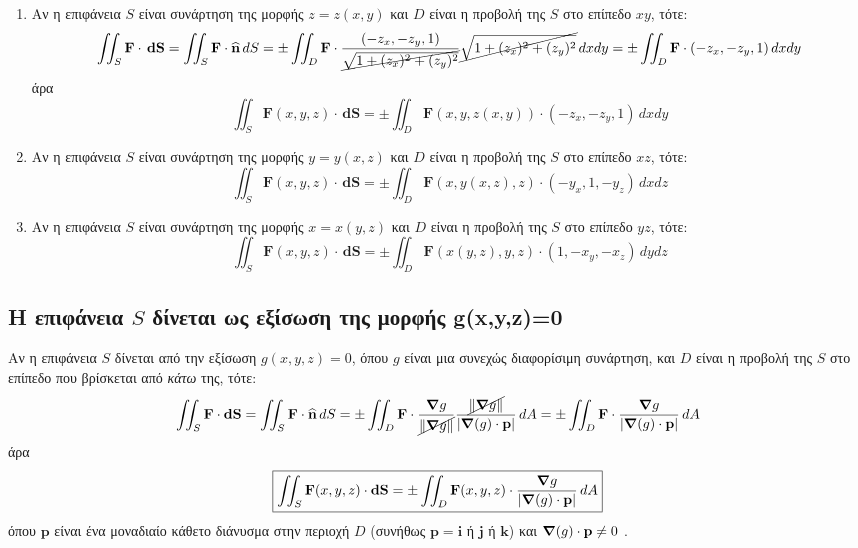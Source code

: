 \begin{enumerate}
  \item Αν η επιφάνεια $S$ είναι συνάρτηση της μορφής $ z=z(x,y) $ και $D$ είναι η 
    προβολή της $S$ στο επίπεδο $ xy $, τότε: 
    \[
      \iint_{S} \mathbf{F} \cdot \,{\mathbf{dS}} = \iint_{S} \mathbf{F} \cdot
      \mathbf{\widehat{n}} \,{dS} = 
      \pm\iint_{D} 
      \mathbf{F} \cdot \frac{(-z_{x},-z_{y},1)}{\cancel{\sqrt{1+(z_{x})^{2}+
      (z_{y})^{2}}}} \cancel{\sqrt{1+(z_{x})^{2}+(z_{y})^{2}}} \,{dx}{dy} = 
      \pm\iint_{D} \mathbf{F} \cdot (-z_{x},-z_{y},1) \,{dx}{dy}
    \]
    άρα
    \begin{equation*}
      \boxed{\iint_{S} \mathbf{F}(x,y,z) \cdot \,{\mathbf{dS}} = \pm\iint_{D} 
      \mathbf{F}(x,y,z(x,y)) \cdot (-z_{x},-z_{y},1) \,{dx}{dy}}
    \end{equation*} 

  \item Αν η επιφάνεια $S$ είναι συνάρτηση της μορφής $ y=y(x,z) $ και $D$ είναι η 
    προβολή της $S$ στο επίπεδο $ xz $, τότε: 
    \begin{equation*}
      \boxed{\iint_{S} \mathbf{F}(x,y,z) \cdot \,{\mathbf{dS}} = \pm\iint_{D} 
      \mathbf{F}(x,y(x,z),z) \cdot (-y_{x},1,-y_{z}) \,{dx}{dz}}
    \end{equation*}

  \item Αν η επιφάνεια $S$ είναι συνάρτηση της μορφής $ x=x(y,z) $ και $D$ είναι η 
    προβολή της $S$ στο επίπεδο $ yz $, τότε: 
    \begin{equation*}
      \boxed{\iint_{S} \mathbf{F}(x,y,z) \cdot \,{\mathbf{dS}} = \pm\iint_{D} 
      \mathbf{F}(x(y,z),y,z) \cdot (1,-x_{y},-x_{z}) \,{dy}{dz}}
    \end{equation*}

\end{enumerate}

\subsection*{Η επιφάνεια $S$ δίνεται ως εξίσωση της μορφής g(x,y,z)=0}
Αν η επιφάνεια $S$ δίνεται από την εξίσωση $ g(x,y,z) = 0 $, όπου $ g $ είναι μια 
συνεχώς διαφορίσιμη συνάρτηση, και $D$ είναι η προβολή της $S$ στο επίπεδο που βρίσκεται 
από \textit{κάτω} της, τότε:
\begin{equation*}
  \iint_{S} \mathbf{F}\cdot {\mathbf{dS}} = \iint_{S} \mathbf{F} \cdot 
  \mathbf{\widehat{n}} \,{dS} = 
  \pm\iint_{D} \mathbf{F} \cdot \frac{\grad{g}}{\cancel{\norm{\grad
  g}}}\frac{\cancel{\norm{\grad g}}}{\abs{\grad(g) \cdot \mathbf{p}}} \,{dA} =
  \pm\iint_{D} \mathbf{F} \cdot 
  \frac{\grad{g}}{\abs{\grad(g) \cdot \mathbf{p}}} \,{dA} 
\end{equation*}
άρα
\begin{equation}\label{eq:surface_int3}
  \boxed{\iint_{S} \mathbf{F}(x,y,z) \cdot {\mathbf{dS}} = 
    \pm\iint_{D} \mathbf{F}(x,y,z) \cdot 
  \frac{\grad{g}}{\abs{\grad(g) \cdot \mathbf{p}}} \,{dA}}
\end{equation}
όπου $ \mathbf{p} $ είναι ένα μοναδιαίο κάθετο διάνυσμα στην περιοχή $D$ (συνήθως 
$ \mathbf{p} = \mathbf{i} $ ή $ \mathbf{j} $ ή $ \mathbf{k} $) και 
$ \grad(g)\cdot \mathbf{p} \neq 0 $ .  

